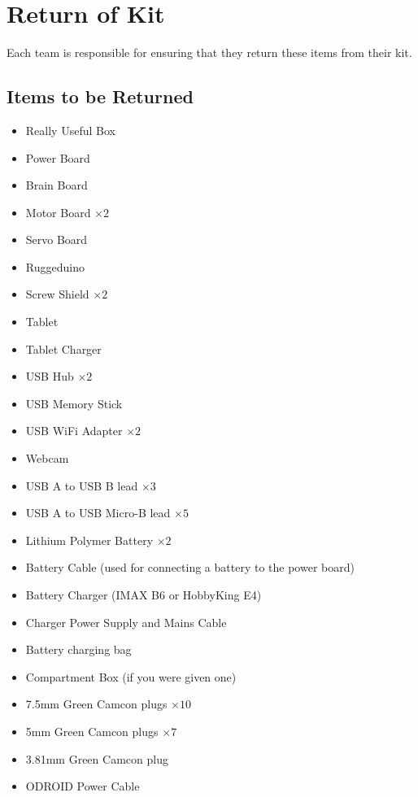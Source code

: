 \section {Return of Kit}
\label{sec:kit-return}

Each team is responsible for ensuring that they return these items from their kit.

\subsection {Items to be Returned}

\begin{itemize}
 \setlength{\itemsep}{0.3em}
 \item Really Useful Box

 \item Power Board
 \item Brain Board
 \item Motor Board $\times 2$
 \item Servo Board
 \item Ruggeduino
 \item Screw Shield $\times 2$

 \item Tablet
 \item Tablet Charger

 \item USB Hub $\times 2$
 \item USB Memory Stick
 \item USB WiFi Adapter $\times 2$
 \item Webcam
 \item USB A to USB B lead $\times 3$
 \item USB A to USB Micro-B lead $\times 5$

 \item Lithium Polymer Battery $\times 2$
 \item Battery Cable (used for connecting a battery to the power board)
 \item Battery Charger (IMAX B6 or HobbyKing E4)
 \item Charger Power Supply and Mains Cable
 \item Battery charging bag

 \item Compartment Box (if you were given one)
 \item 7.5mm Green Camcon plugs $\times 10$
 \item 5mm Green Camcon plugs $\times 7$
 \item 3.81mm Green Camcon plug
 \item ODROID Power Cable
\end{itemize}

